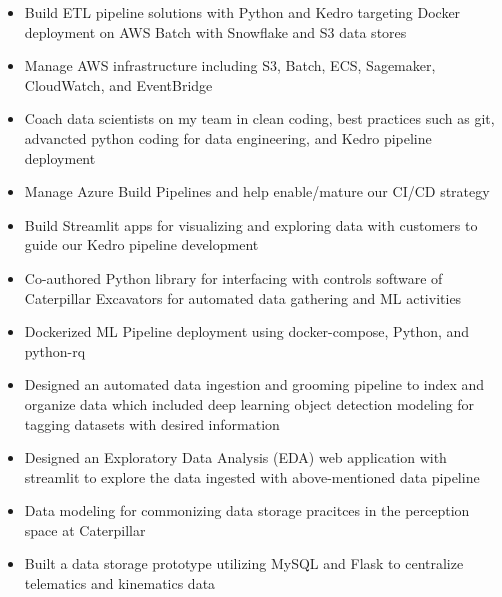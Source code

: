 \documentclass[10pt,a4paper,ragged2e,withhyper]{altacv}
\begin{document}
\begin{paracol}{2}



\begin{itemize}

\item Build ETL pipeline solutions with Python and Kedro targeting Docker deployment on AWS Batch with Snowflake and S3 data stores
\item Manage AWS infrastructure including S3, Batch, ECS, Sagemaker, CloudWatch, and EventBridge 
\item Coach data scientists on my team in clean coding, best practices such as git, advancted python coding for data engineering, and Kedro pipeline deployment 
\item Manage Azure Build Pipelines and help enable/mature our CI/CD strategy
\item Build Streamlit apps for visualizing and exploring data with customers to guide our Kedro pipeline development 

\end{itemize}

\divider

\begin{itemize}
\item  Co-authored Python library for interfacing with controls software of Caterpillar Excavators for automated data gathering and ML activities
\item  Dockerized ML Pipeline deployment using docker-compose, Python, and python-rq
\item  Designed an automated data ingestion and grooming pipeline to index and organize data which included deep learning object detection modeling for tagging datasets with desired information
\item  Designed an Exploratory Data Analysis (EDA) web application with streamlit to explore the data ingested with above-mentioned data pipeline
\item  Data modeling for commonizing data storage pracitces in the perception space at Caterpillar
\item  Built a data storage prototype utilizing MySQL and Flask to centralize telematics and kinematics data
\end{itemize}


\end{paracol}
\end{document}
